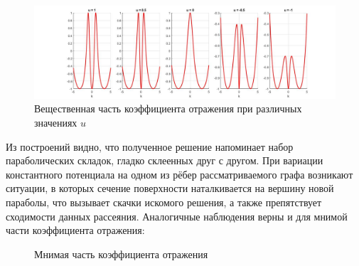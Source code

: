 \documentclass[a4 paper, 12 pt]{extarticle}
\begin{document}
   \begin{figure}[!htb]
   \centering
   \includegraphics[scale=0.35]{real.jpg}
   \caption{Вещественная часть коэффициента отражения при различных значениях $u$}
   \end{figure}

   Из построений видно, что полученное решение напоминает набор параболических складок, гладко склеенных друг с другом. 
   При вариации константного потенциала на одном из рёбер рассматриваемого графа возникают ситуации, в которых сечение поверхности наталкивается на вершину новой параболы, что вызывает скачки искомого решения, а также препятствует сходимости данных рассеяния.
   Аналогичные наблюдения верны и для мнимой части коэффициента отражения:

   \begin{figure}[!htb]
   	\begin{minipage}[h]{0.49\linewidth}
   	\end{minipage}
   	\begin{minipage}[h]{0.49\linewidth}
   	\end{minipage}
   	\caption{Мнимая часть коэффициента отражения}
   	\label{fig:imag}
   \end{figure}
\end{document}
